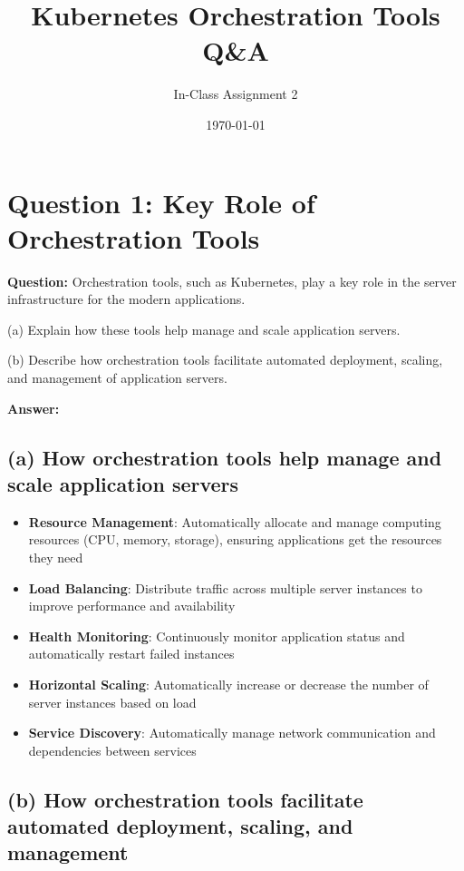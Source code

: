 \documentclass[12pt,a4paper]{article}
\title{Kubernetes Orchestration Tools Q\&A}
\author{In-Class Assignment 2}
\date{\today}
\begin{document}
\maketitle

\section{Question 1: Key Role of Orchestration Tools}

\textbf{Question:} Orchestration tools, such as Kubernetes, play a key role in the server infrastructure for the modern applications.

(a) Explain how these tools help manage and scale application servers.

(b) Describe how orchestration tools facilitate automated deployment, scaling, and management of application servers.

\textbf{Answer:}

\subsection{(a) How orchestration tools help manage and scale application servers}

\begin{itemize}
    \item \textbf{Resource Management}: Automatically allocate and manage computing resources (CPU, memory, storage), ensuring applications get the resources they need
    \item \textbf{Load Balancing}: Distribute traffic across multiple server instances to improve performance and availability
    \item \textbf{Health Monitoring}: Continuously monitor application status and automatically restart failed instances
    \item \textbf{Horizontal Scaling}: Automatically increase or decrease the number of server instances based on load
    \item \textbf{Service Discovery}: Automatically manage network communication and dependencies between services
\end{itemize}

\subsection{(b) How orchestration tools facilitate automated deployment, scaling, and management}
\end{document}

